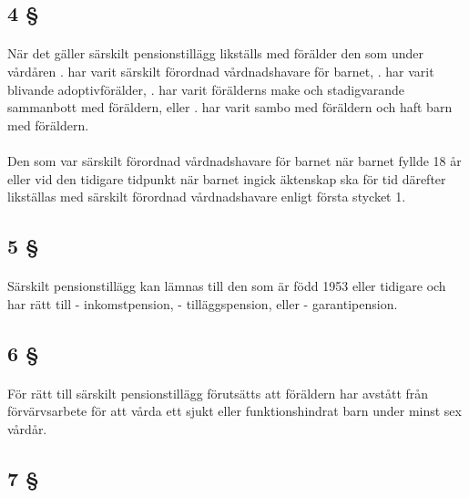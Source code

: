 \documentclass[a4paper,notitlepage,openany,10pt]{book}
\begin{document}
\subsection*{4 §}
\paragraph*{}
När det gäller särskilt pensionstillägg likställs med förälder den som under vårdåren
. har varit särskilt förordnad vårdnadshavare för barnet,
. har varit blivande adoptivförälder,
. har varit förälderns make och stadigvarande sammanbott med föräldern, eller
. har varit sambo med föräldern och haft barn med föräldern.
\paragraph*{}
Den som var särskilt förordnad vårdnadshavare för barnet när barnet fyllde 18 år eller vid den tidigare tidpunkt när barnet ingick äktenskap ska för tid därefter likställas med särskilt förordnad vårdnadshavare enligt första stycket 1.
\subsection*{5 §}
\paragraph*{}
Särskilt pensionstillägg kan lämnas till den som är född 1953 eller tidigare och har rätt till
\newline - inkomstpension,
\newline - tilläggspension, eller
\newline - garantipension.
\subsection*{6 §}
\paragraph*{}
För rätt till särskilt pensionstillägg förutsätts att föräldern har avstått från förvärvsarbete för att vårda ett sjukt eller funktionshindrat barn under minst sex vårdår.
\subsection*{7 §}
\end{document}
